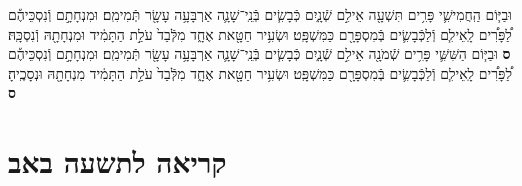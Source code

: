 \documentclass[twoside, openany, parskip=half, 11pt]{book}
\begin{document}
\begin{sometimes}
\begin{footnotesize}
\begin{multicols}{2}
וּבַיּ֧וֹם הַֽחֲמִישִׁ֛י פָּרִ֥ים תִּשְׁעָ֖ה אֵילִ֣ם שְֿׁנָ֑יִם כְּֿבָשִׂ֧ים בְּֿנֵֽי־שָׁנָ֛ה אַרְבָּעָ֥ה עָשָׂ֖ר תְּֿמִימִֽם׃ וּמִנְחָתָ֣ם וְֿנִסְכֵּיהֶ֡ם לַ֠פָּרִ֠ים לָֽאֵילִ֧ם וְֿלַכְּֿבָשִׂ֛ים בְּֿמִסְפָּרָ֖ם כַּמִּשְׁפָּֽט׃ וּשְׂעִ֥יר חַטָּ֖את אֶחָ֑ד מִלְּֿבַד֙ עֹלַ֣ת הַתָּמִ֔יד וּמִנְחָתָ֖הּ וְֿנִסְכָּֽהּ׃ \textbf{ס}
וּבַיּ֧וֹם הַשִּׁשִּׁ֛י פָּרִ֥ים שְֿׁמֹנָ֖ה אֵילִ֣ם שְֿׁנָ֑יִם כְּֿבָשִׂ֧ים בְּֿנֵֽי־שָׁנָ֛ה אַרְבָּעָ֥ה עָשָׂ֖ר תְּֿמִימִֽם׃ וּמִנְחָתָ֣ם וְֿנִסְכֵּיהֶ֡ם לַ֠פָּרִ֠ים לָֽאֵילִ֧ם וְֿלַכְּֿבָשִׂ֛ים בְּֿמִסְפָּרָ֖ם כַּמִּשְׁפָּֽט׃ וּשְׂעִ֥יר חַטָּ֖את אֶחָ֑ד מִלְּֿבַד֙ עֹלַ֣ת הַתָּמִ֔יד מִנְחָתָ֖הּ וּנְסָכֶֽיהָ׃ \textbf{ס}

\end{multicols}

\section[תשעה באב]{קריאה לתשעה באב}




\end{footnotesize}
\end{sometimes}
\end{document}
